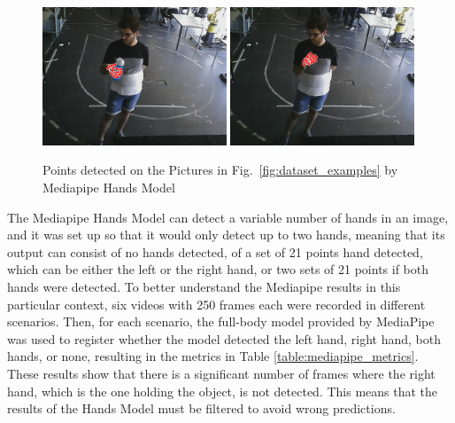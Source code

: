 \begin{figure}[H]
    \centerline{\includegraphics[width=0.49\textwidth]{figs/dataset_preprocessing2_1.png} \includegraphics[width=0.49\textwidth]{figs/dataset_preprocessing2_2.png}}
    \caption[Points detected on the Pictures in Fig.~\ref{fig:dataset_examples} by Mediapipe Hands Model]{Points detected on the Pictures in Fig.~\ref{fig:dataset_examples} by Mediapipe Hands Model}
    \label{fig:dataset_examples2}
\end{figure}

The Mediapipe Hands Model can detect a variable number of hands in an image, and it was set up so that it would only detect up to two hands, meaning that its output can consist of no hands detected, of a set of 21 points hand detected, which can be either the left or the right hand, or two sets of 21 points if both hands were detected. To better understand the Mediapipe results in this particular context, six videos with 250 frames each were recorded in different scenarios. Then, for each scenario, the full-body model provided by MediaPipe was used to register whether the model detected the left hand, right hand, both hands, or none, resulting in the metrics in Table \ref{table:mediapipe_metrics}. These results show that there is a significant number of frames where the right hand, which is the one holding the object, is not detected. This means that the results of the Hands Model must be filtered to avoid wrong predictions.

